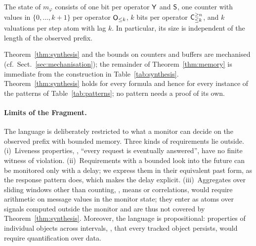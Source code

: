\begin{theorem}\label{thm:memory}
  The state of $m_\varphi$ consists of one bit per operator $\Yop$ and $\Sop$, one counter with values in $\{0, \dots, k+1\}$ per operator $\Owin{k}$, $k$ bits per operator $\Cwin{k}{n}$, and $k$ valuations per step atom with lag $k$. In particular, its size is independent of the length of the observed prefix.
\end{theorem}

\noindent
Theorem~\ref{thm:synthesis} and the bounds on counters and buffers are mechanised (cf.\ Sect.~\ref{sec:mechanisation}); the remainder of Theorem~\ref{thm:memory} is immediate from the construction in Table~\ref{tab:synthesis}. Theorem~\ref{thm:synthesis} holds for every formula and hence for every instance of the patterns of Table~\ref{tab:patterns}; no pattern needs a proof of its own.

\paragraph{Limits of the Fragment.}
The language is deliberately restricted to what a monitor can decide on the observed prefix with bounded memory. Three kinds of requirements lie outside. (i)~Liveness properties, \eg, ``every request is eventually answered'', have no finite witness of violation. (ii)~Requirements with a bounded look into the future can be monitored only with a delay; we express them in their equivalent past form, as the response pattern does, which makes the delay explicit. (iii)~Aggregates over sliding windows other than counting, \eg, means or correlations, would require arithmetic on message values in the monitor state; they enter as atoms over signals computed outside the monitor and are thus not covered by Theorem~\ref{thm:synthesis}. Moreover, the language is propositional: properties of individual objects across intervals, \eg, that every tracked object persists, would require quantification over data.
